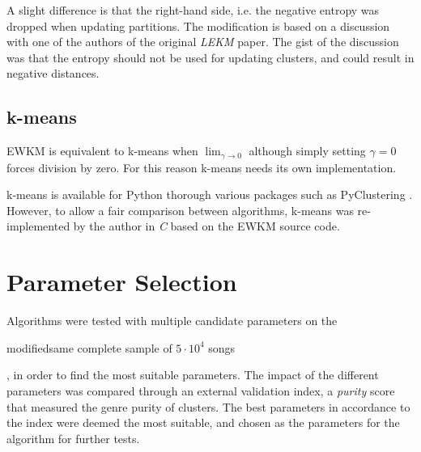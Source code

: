 \documentclass[../report.tex]{subfiles}
\begin{document}
A slight difference is that the right-hand side, i.e. the negative entropy was dropped when updating partitions. The modification is based on a discussion with one of the authors of the original \textit{LEKM} paper. The gist of the discussion was that the entropy should not be used for updating clusters, and could result in negative distances.

\subsection{k-means}
EWKM is equivalent to k-means when $\lim_{\gamma \to 0}$ although simply setting $\gamma = 0$ forces division by zero. For this reason k-means needs its own implementation.

k-means is available for Python thorough various packages such as PyClustering \cite{Novikov2019}. However, to allow a fair comparison between algorithms, k-means was re-implemented by the author in \textit{C} based on the EWKM source code.

\section{Parameter Selection}
Algorithms were tested with multiple candidate parameters on the \begin{color}{modified}{same complete sample of $5 \cdot 10^{4}$ songs}\end{color}, in order to find the most suitable parameters. The impact of the different parameters was compared through an external validation index, a \textit{purity} score that measured the genre purity of clusters. The best parameters in accordance to the index were deemed the most suitable, and chosen as the parameters for the algorithm for further tests. 
\end{document}
